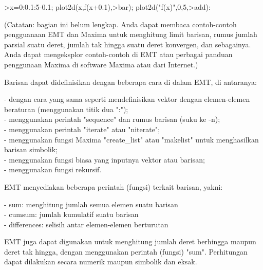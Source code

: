 \documentclass{article}
\begin{document}
\begin{eulernotebook}
\begin{eulercomment}
\begin{eulercomment}
\begin{eulercomment}
\begin{eulercomment}
\begin{eulercomment}
\begin{eulercomment}
\begin{eulerformula}
\[\]
\end{eulerformula}
\begin{eulerprompt}
>x=0:0.1:5-0.1; plot2d(x,f(x+0.1),>bar); plot2d("f(x)",0,5,>add):
\end{eulerprompt}
\begin{eulercomment}
(Catatan: bagian ini belum lengkap. Anda dapat membaca contoh-contoh pengguanaan EMT dan
Maxima untuk menghitung limit barisan, rumus jumlah parsial suatu deret, jumlah tak hingga
suatu deret konvergen, dan sebagainya. Anda dapat mengeksplor contoh-contoh di EMT atau
perbagai panduan penggunaan Maxima di software Maxima atau dari Internet.)

Barisan dapat didefinisikan dengan beberapa cara di dalam EMT, di antaranya:

- dengan cara yang sama seperti mendefinisikan vektor dengan elemen-elemen beraturan
(menggunakan titik dua ":");\\
- menggunakan perintah "sequence" dan rumus barisan (suku ke -n);\\
- menggunakan perintah "iterate" atau "niterate";\\
- menggunakan fungsi Maxima "create\_list" atau "makelist" untuk menghasilkan barisan
simbolik;\\
- menggunakan fungsi biasa yang inputnya vektor atau barisan;\\
- menggunakan fungsi rekursif.

EMT menyediakan beberapa perintah (fungsi) terkait barisan, yakni:

- sum: menghitung jumlah semua elemen suatu barisan\\
- cumsum: jumlah kumulatif suatu barisan\\
- differences: selisih antar elemen-elemen berturutan

EMT juga dapat digunakan untuk menghitung jumlah deret berhingga maupun deret tak hingga,
dengan menggunakan perintah (fungsi) "sum". Perhitungan dapat dilakukan secara numerik
maupun simbolik dan eksak.


\end{eulercomment}
\end{eulercomment}
\end{eulercomment}
\end{eulercomment}
\end{eulercomment}
\end{eulercomment}
\end{eulercomment}
\end{eulernotebook}
\end{document}
